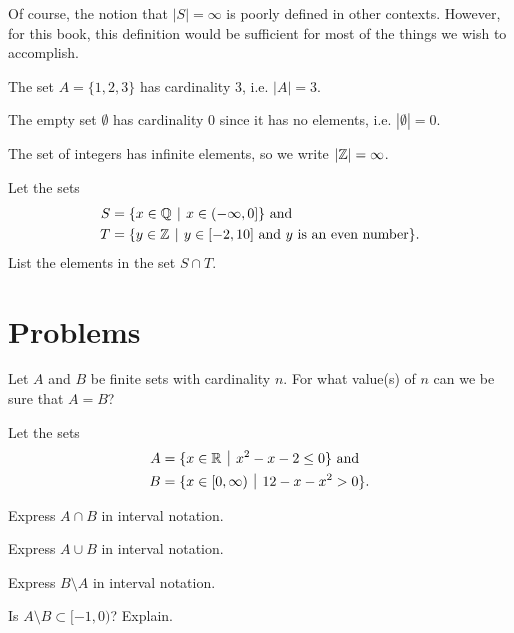 \begin{remark}
    Of course, the notion that $|S| = \infty$ is poorly defined in other contexts. However, for this book, this definition would be sufficient for most of the things we wish to accomplish.
\end{remark}

\begin{example}
    The set $A = \{1, 2, 3\}$ has cardinality 3, i.e. $|A| = 3$.
\end{example}

\begin{example}
    The empty set $\emptyset$ has cardinality 0 since it has no elements, i.e. $|\emptyset| = 0$.
\end{example}

\begin{example}
    The set of integers has infinite elements, so we write $|\mathbb{Z}| = \infty$.
\end{example}

\begin{exercise}
    Let the sets
    \begin{align*}
        S &= \{x \in \Q \vert x \in (-\infty, 0]\} \text{ and}\\
        T &= \{y \in \Z \vert y \in [-2, 10] \text{ and } y \text{ is an even number} \}.
    \end{align*}
    List the elements in the set $S \cap T$.
\end{exercise}

\newpage

\section{Problems}
\begin{problem}
    Let $A$ and $B$ be finite sets with cardinality $n$. For what value(s) of $n$ can we be sure that $A = B$?
\end{problem}

\begin{problem}
    Let the sets
    \begin{align*}
        A &= \{x \in \R \vert x^2 - x - 2 \leq 0\} \text{ and}\\
        B &= \{x \in [0, \infty) \vert 12 - x - x^2 > 0\}.
    \end{align*}
    \begin{partquestions}{\alph*}
        \item Express $A \cap B$ in interval notation.
        \item Express $A \cup B$ in interval notation.
        \item Express $B \setminus A$ in interval notation.
        \item Is $A \setminus B \subset [-1, 0)$? Explain.
    \end{partquestions}
\end{problem}

